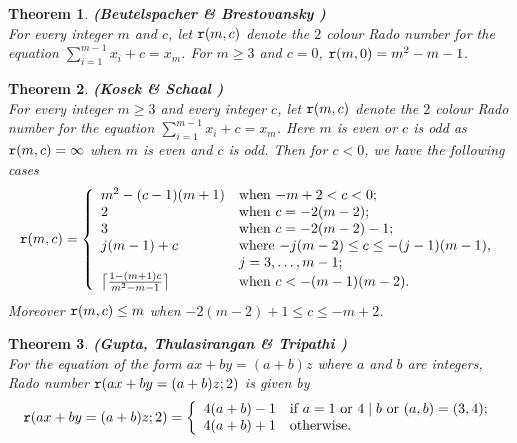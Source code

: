 \documentclass[12pt]{report}
\newtheorem{thm}{Theorem}[chapter]
\begin{document}
\begin{thm} {\bf (Beutelspacher \& Brestovansky {\cite{BB}})} \\[5pt]
For every integer $m$ and $c$, let ${\tt{r}}(m,c)$ denote the $2$ colour Rado number for the equation $\sum_{i=1}^{m-1} x_i + c=x_m$. For $m \geq 3$ and $c=0$, ${\tt{r}}(m,0)=m^2-m-1$.
\end{thm}

\begin{thm} {\bf (Kosek \& Schaal {\cite{KS}})} \\[5pt]
For every integer $m \geq 3$ and every integer $c$, let ${\tt{r}}(m,c)$ denote the $2$ colour Rado number for the equation $\sum_{i=1}^{m-1} x_i + c=x_m$. Here $m$ is even or $c$ is odd as ${\tt{r}}(m,c)=\infty$ when $m$ is even and $c$ is odd. Then for $c<0$, we have the following cases
\[ {\tt{r}}(m,c) = \left \{ \begin{array}{ll}
                                       m^2-(c-1)(m+1) & \mbox{when $-m+2<c<0$}; \\
                                       2 & \mbox{when $c=-2(m-2)$};\\
                                       3 & \mbox{when $c=-2(m-2)-1$};\\
                                       j(m-1)+c & \mbox{where $-j(m-2) \leq c \leq -(j-1)(m-1)$,} \\
                                                & \mbox{$j=3,\ldots,m-1$};\\
                                       \big \lceil {\frac {1-(m+1)c}{m^2-m-1}} \big \rceil & \mbox{when $c<-(m-1)(m-2)$}.
                                     \end{array}
                        \right. 
\]
Moreover ${\tt{r}}(m,c) \leq m$ when $-2(m-2)+1 \leq c \leq -m+2$.

\end{thm}

\begin{thm}{\bf (Gupta, Thulasirangan \& Tripathi {\cite{GTT}})} \\[5pt]
For the equation of the form $ax+by=(a+b)z$ where $a$ and $b$ are integers, Rado number ${\tt{r}}(ax+by=(a+b)z;2)$ is given by
\[ {\tt{r}}(ax+by=(a+b)z;2) = \left\{ \begin{array}{ll}
                            4(a+b)-1 & \mbox{if $a=1$ or $4\mid b$ or $(a,b)=(3,4)$};\\
                            4(a+b)+1& \mbox{otherwise}.
                                      \end{array}                                  
                             \right.
\]
\end{thm}
\end{document}

